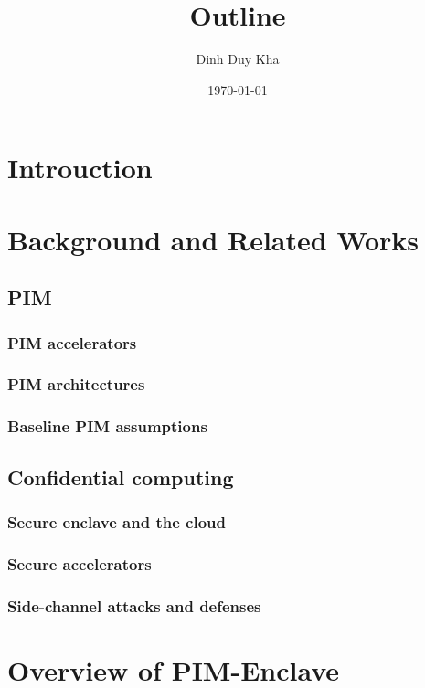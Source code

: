 \documentclass[11pt]{article}
\author{Dinh Duy Kha}
\date{\today}
\title{Outline}
\begin{document}
\maketitle
\tableofcontents

\section{Introuction}
\label{sec:orgbfa7fe1}
\section{Background and Related Works}
\label{sec:orgf841941}
\subsection{PIM}
\label{sec:orgb01d4e2}
\subsubsection{PIM accelerators}
\label{sec:org4d8ee4e}
\subsubsection{PIM architectures}
\label{sec:orgda0d2ae}
\subsubsection{Baseline PIM assumptions}
\label{sec:orgb531ace}
\subsection{Confidential computing}
\label{sec:org4b22eb1}
\subsubsection{Secure enclave and the cloud}
\label{sec:org91490c6}
\subsubsection{Secure accelerators}
\label{sec:org4e2bd4f}
\subsubsection{Side-channel attacks and defenses}
\label{sec:org501865d}
\section{Overview of PIM-Enclave}
\label{sec:orgd2443a8}
\end{document}
